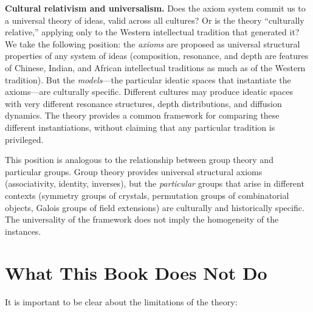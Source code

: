 \documentclass[11pt,openany]{book}
\theoremstyle{definition}
\theoremstyle{plain}
\theoremstyle{remark}
\begin{document}
\textbf{Cultural relativism and universalism.} Does the axiom system commit us to a universal theory of ideas, valid across all cultures? Or is the theory ``culturally relative,'' applying only to the Western intellectual tradition that generated it? We take the following position: the \emph{axioms} are proposed as universal structural properties of any system of ideas (composition, resonance, and depth are features of Chinese, Indian, and African intellectual traditions as much as of the Western tradition). But the \emph{models}---the particular ideatic spaces that instantiate the axioms---are culturally specific. Different cultures may produce ideatic spaces with very different resonance structures, depth distributions, and diffusion dynamics. The theory provides a common framework for comparing these different instantiations, without claiming that any particular tradition is privileged.

This position is analogous to the relationship between group theory and particular groups. Group theory provides universal structural axioms (associativity, identity, inverses), but the \emph{particular} groups that arise in different contexts (symmetry groups of crystals, permutation groups of combinatorial objects, Galois groups of field extensions) are culturally and historically specific. The universality of the framework does not imply the homogeneity of the instances.

\section{What This Book Does Not Do}

It is important to be clear about the limitations of the theory:
\end{document}
